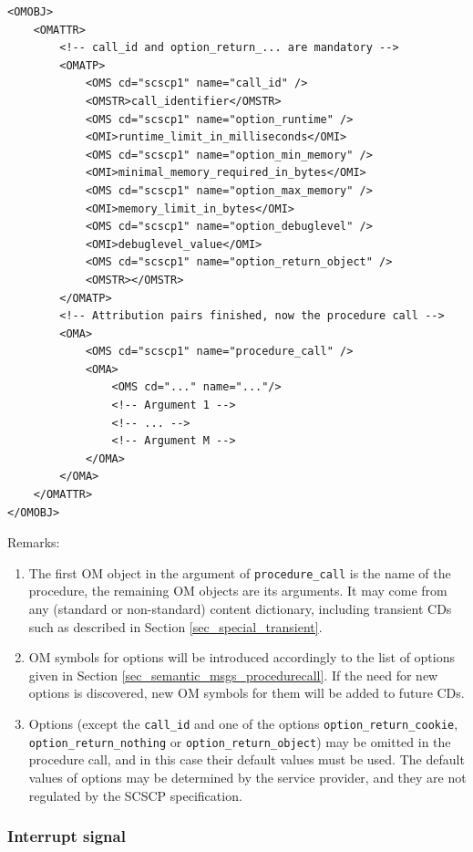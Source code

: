 \documentclass{amsart}
\begin{document}
\begin{verbatim}
<OMOBJ>
    <OMATTR>
        <!-- call_id and option_return_... are mandatory -->
        <OMATP>
            <OMS cd="scscp1" name="call_id" />
            <OMSTR>call_identifier</OMSTR>
            <OMS cd="scscp1" name="option_runtime" />
            <OMI>runtime_limit_in_milliseconds</OMI>
            <OMS cd="scscp1" name="option_min_memory" />
            <OMI>minimal_memory_required_in_bytes</OMI>
            <OMS cd="scscp1" name="option_max_memory" />
            <OMI>memory_limit_in_bytes</OMI>
            <OMS cd="scscp1" name="option_debuglevel" />
            <OMI>debuglevel_value</OMI>
            <OMS cd="scscp1" name="option_return_object" />
            <OMSTR></OMSTR>
        </OMATP>
        <!-- Attribution pairs finished, now the procedure call -->
        <OMA>
            <OMS cd="scscp1" name="procedure_call" />
            <OMA>
                <OMS cd="..." name="..."/> 
                <!-- Argument 1 -->
                <!-- ... -->
                <!-- Argument M -->
            </OMA>
        </OMA>
    </OMATTR>
</OMOBJ>
\end{verbatim}

Remarks:
\begin{enumerate}
\item
The first OM object in the argument of \verb|procedure_call| is the 
name of the procedure, the remaining OM objects are its arguments. It may come
from any (standard or non-standard) content dictionary, including transient CDs
such as described in Section \ref{sec_special_transient}. 
\item
OM symbols for options will be introduced accordingly to the list of options
given in Section \ref{sec_semantic_msgs_procedurecall}. 
If the need for new options is discovered, new OM
symbols for them will be added to future CDs.
\item
Options (except the \verb|call_id| and one of the options \verb|option_return_cookie|, \\
\verb|option_return_nothing| or \verb|option_return_object|) 
may be omitted in the procedure call, 
and in this case their default values must be used.
The default values of options may be determined by
the service provider, and they are not regulated by the
SCSCP specification.
\end{enumerate}

\subsubsection{Interrupt signal}
\end{document}
